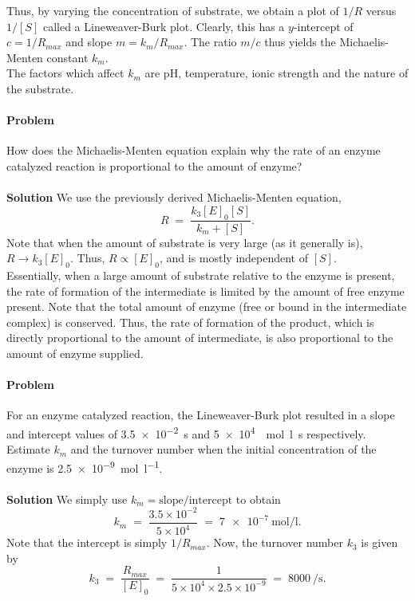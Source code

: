 \documentclass[10pt]{article}
\newcounter{prob}
\def\problem{\stepcounter{prob}\paragraph{Problem \arabic{prob}}}
\def\solution{\\\\\textbf{Solution }}
\begin{document}
        Thus, by varying the concentration of substrate, we obtain a plot of $1 /R$ versus $1 /[S]$ called a Lineweaver-Burk plot.
        Clearly, this has a $y$-intercept of $c = 1 /R_{max}$ and slope $m = k_m/ R_{max}$. The ratio $m /c$ thus yields the Michaelis-Menten
        constant $k_m$. \\

        The factors which affect $k_m$ are pH, temperature, ionic strength and the nature of the substrate.

        \problem How does the Michaelis-Menten equation explain why the rate of an enzyme catalyzed reaction is proportional to the amount of enzyme?
        \solution We use the previously derived Michaelis-Menten equation, 
        \[
        R \;=\; \frac{k_3 [E]_0 [S]}{k_m + [S]}.
        \]
        Note that when the amount of substrate is very large (as it generally is), $R \to k_3 [E]_0$.
        Thus, $R \propto [E]_0$, and is mostly independent of $[S]$.\\

        Essentially, when a large amount of substrate relative to the enzyme is present, the rate of formation of the intermediate
        is limited by the amount of free enzyme present. 
        Note that the total amount of enzyme (free or bound in the intermediate complex) is conserved.
        Thus, the rate of formation of the product, which is directly proportional to the 
        amount of intermediate, is also proportional to the amount of enzyme supplied.

        \problem For an enzyme catalyzed reaction, the Lineweaver-Burk plot resulted in a slope and intercept values of \SI{3.5e-2}{\s}
        and \SI{5e4}{\per\mole\litre\s} respectively. Estimate $k_m$ and the turnover number when the initial concentration
        of the enzyme is \SI{2.5e-9}{\mole\per\litre}.
        \solution We simply use $k_m = \text{slope}/\text{intercept}$ to obtain 
        \[
        k_m \;=\; \frac{3.5 \times 10^{-2}}{5\times 10^4} \;=\; \SI{7e-7}{\mole\per\litre}.
        \]
        Note that the intercept is simply $1 /R_{max}$.
        Now, the turnover number $k_3$ is given by
        \[
        k_3 \;=\; \frac{R_{max}}{[E]_0} \;=\;  \frac{1}{5\times 10^4 \times 2.5\times 10^{-9}} \;=\; \SI{8000}{\per\s}.
        \]
\end{document}
